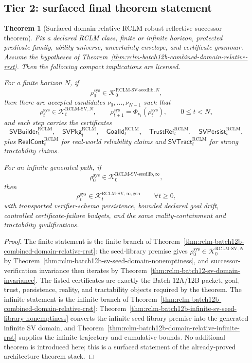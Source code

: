 \documentclass[11pt,a4paper]{article}
\newtheorem{theorem}{Theorem}[section]
\newcommand{\Kcal}{\mathcal K}
\newcommand{\RCLM}{\mathrm{RCLM}}
\newcommand{\sys}{\mathrm{sys}}
\begin{document}
\subsection{Tier 2: surfaced final theorem statement}

\begin{theorem}[Surfaced domain-relative RCLM robust reflective successor theorem]
\label{thm:rclm-final-surfaced-domain-relative-rrst}
Fix a declared RCLM class, finite or infinite horizon, protected predicate family, ability universe, uncertainty envelope, and certificate grammar.  Assume the hypotheses of Theorem~\ref{thm:rclm-batch12b-combined-domain-relative-rrst}.  Then the following compact implications are licensed.

For a finite horizon \(N\), if
\[
\rho_0^{\sys}
\in
\Kcal_0^{\RCLM\text{-}\mathrm{SV\mbox{-}seedlib},N},
\]
then there are accepted candidates \(\nu_0,\ldots,\nu_{N-1}\) such that
\[
\rho_t^{\sys}
\in
\Kcal_t^{\RCLM\text{-}\mathrm{SV},N},
\qquad
\rho_{t+1}^{\sys}=\Phi_{\nu_t}(\rho_t^{\sys}),
\qquad
0\le t<N,
\]
and each step carries the certificates
\[
\mathsf{SVBuilder}_t^{\RCLM},
\quad
\mathsf{SVPkg}_t^{\RCLM},
\quad
\mathsf{GoalId}_t^{\RCLM},
\quad
\mathsf{TrustRef}_t^{\RCLM},
\quad
\mathsf{SVPersist}_t^{\RCLM},
\]
plus \(\mathsf{RealCont}_t^{\RCLM}\) for real-world reliability claims and \(\mathsf{SVTract}_t^{\RCLM}\) for strong tractability claims.

For an infinite generated path, if
\[
\rho_0^{\sys}
\in
\Kcal_0^{\RCLM\text{-}\mathrm{SV\mbox{-}seedlib},\infty},
\]
then
\[
\rho_t^{\sys}
\in
\Kcal_t^{\RCLM\text{-}\mathrm{SV},\infty,\mathrm{gen}}
\qquad
\forall t\ge0,
\]
with transported verifier-schema persistence, bounded declared goal drift, controlled certificate-failure budgets, and the same reality-containment and tractability qualifications.
\end{theorem}

\begin{proof}
The finite statement is the finite branch of Theorem~\ref{thm:rclm-batch12b-combined-domain-relative-rrst}: the seed-library premise gives \(\rho_0^{\sys}\in\Kcal_0^{\RCLM\text{-}\mathrm{SV},N}\) by Theorem~\ref{thm:rclm-batch12b-sv-seed-domain-nonemptiness}, and successor-verification invariance then iterates by Theorem~\ref{thm:rclm-batch12-sv-domain-invariance}.  The listed certificates are exactly the Batch-12A/12B packet, goal, trust, persistence, reality, and tractability objects required by the theorem.  The infinite statement is the infinite branch of Theorem~\ref{thm:rclm-batch12b-combined-domain-relative-rrst}: Theorem~\ref{thm:rclm-batch12b-infinite-sv-seed-library-nonemptiness} converts the infinite seed-library premise into the generated infinite SV domain, and Theorem~\ref{thm:rclm-batch12b-domain-relative-infinite-rrst} supplies the infinite trajectory and cumulative bounds.  No additional theorem is introduced here; this is a surfaced statement of the already-proved architecture theorem stack.
\end{proof}
\end{document}
